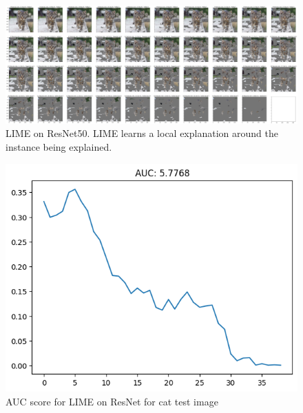 \documentclass{article}
\begin{document}
\begin{figure}
    \centering
    \includegraphics[width=1\linewidth]{results/lime-tabby-feature-removal.png}
    \caption{LIME on ResNet50. LIME learns a local explanation around the instance being explained.}
    \label{fig:lime-tabby-feature-removal}
\end{figure}


\begin{figure}
    \centering
    \includegraphics[width=1\linewidth]{results/lime-tabby-auc.png}
    \caption{AUC score for LIME on ResNet for cat test image}
    \label{fig:lime-tabby-auc}
\end{figure}
\end{document}
